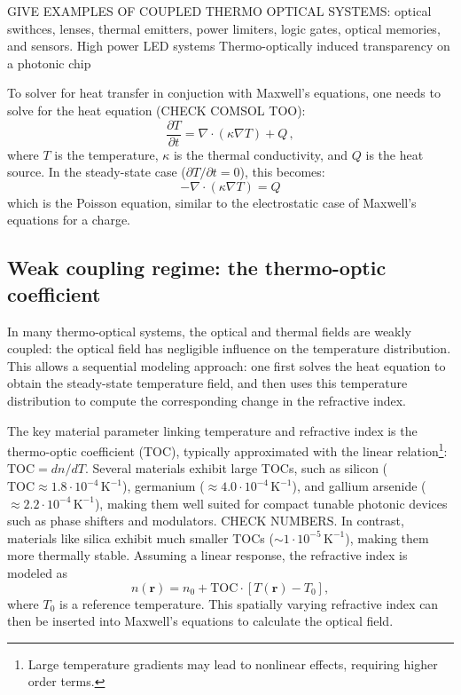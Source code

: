 GIVE EXAMPLES OF COUPLED THERMO OPTICAL SYSTEMS: optical swithces, lenses, thermal emitters,
power limiters, logic gates, optical memories, and sensors.
High power LED systems
Thermo-optically induced transparency on a photonic chip


To solver for heat transfer in conjuction with Maxwell's equations, one needs to solve for the heat equation (CHECK COMSOL TOO):
\begin{equation}
    \frac{\partial T}{\partial t} = \nabla \cdot (\kappa \nabla T) + Q\,,
\end{equation}
where $T$ is the temperature, $\kappa$ is the thermal conductivity, and $Q$ is the heat source.
In the steady-state case ($\partial T / \partial t = 0$), this becomes:
\begin{equation}
    -\nabla \cdot (\kappa \nabla T) = Q
\end{equation}
which is the Poisson equation, similar to the electrostatic case of Maxwell's equations for a charge.

\subsection*{Weak coupling regime: the thermo-optic coefficient \cite{ownpub0}}

In many thermo-optical systems, the optical and thermal fields are weakly coupled: the optical field has negligible influence on the temperature distribution. 
This allows a sequential modeling approach: one first solves the heat equation to obtain the steady-state temperature field, and then uses this temperature distribution to compute the corresponding change in the refractive index. 

The key material parameter linking temperature and refractive index is the thermo-optic coefficient (TOC), typically approximated with the linear relation\footnote{Large temperature gradients may lead to nonlinear effects, requiring higher order terms.}: $\text{TOC} = dn/dT$. 
Several materials exhibit large TOCs, such as silicon ($\text{TOC} \approx 1.8 \cdot 10^{-4}\, \text{K}^{-1}$), germanium ($\approx 4.0 \cdot 10^{-4}\, \text{K}^{-1}$), and gallium arsenide ($\approx 2.2 \cdot 10^{-4}\, \text{K}^{-1}$), making them well suited for compact tunable photonic devices such as phase shifters and modulators. CHECK NUMBERS. In contrast, materials like silica exhibit much smaller TOCs ($\sim 1 \cdot 10^{-5}\, \text{K}^{-1}$), making them more thermally stable. 
Assuming a linear response, the refractive index is modeled as
\begin{equation}
n(\mathbf{r}) = n_0 + \text{TOC} \cdot \left[T(\mathbf{r}) - T_0\right],
\end{equation}
where $T_0$ is a reference temperature. This spatially varying refractive index can then be inserted into Maxwell’s equations to calculate the optical field. 

